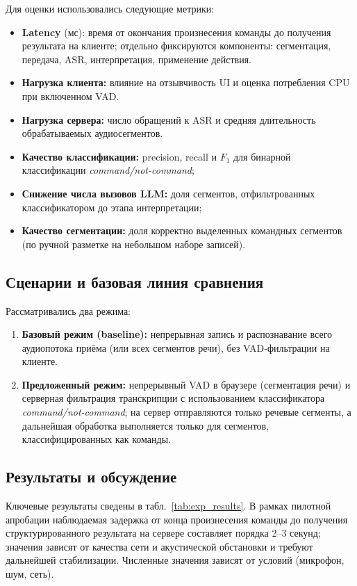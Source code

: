 Для оценки использовались следующие метрики:
\begin{itemize}
    \item \textbf{Latency} (мс): время от окончания произнесения команды до получения результата на клиенте; отдельно фиксируются компоненты: сегментация, передача, ASR, интерпретация, применение действия.
    \item \textbf{Нагрузка клиента:} влияние на отзывчивость UI и оценка потребления CPU при включенном VAD.
    \item \textbf{Нагрузка сервера:} число обращений к ASR и средняя длительность обрабатываемых аудиосегментов.
    \item \textbf{Качество классификации:} precision, recall и $F_1$ для бинарной классификации \textit{command/not-command};
    \item \textbf{Снижение числа вызовов LLM:} доля сегментов, отфильтрованных классификатором до этапа интерпретации;
    \item \textbf{Качество сегментации:} доля корректно выделенных командных сегментов (по ручной разметке на небольшом наборе записей).
\end{itemize}

\subsection{Сценарии и базовая линия сравнения}
\label{subsec:setup}

Рассматривались два режима:
\begin{enumerate}
    \item \textbf{Базовый режим (baseline):} непрерывная запись и распознавание всего аудиопотока приёма (или всех сегментов речи), без VAD‑фильтрации на клиенте.
    \item \textbf{Предложенный режим:} непрерывный VAD в браузере (сегментация речи) и серверная фильтрация транскрипции с использованием классификатора \textit{command/not-command}; на сервер отправляются только речевые сегменты, а дальнейшая обработка выполняется только для сегментов, классифицированных как команды.
\end{enumerate}

\subsection{Результаты и обсуждение}
\label{subsec:results}

Ключевые результаты сведены в табл.~\ref{tab:exp_results}. В рамках пилотной апробации наблюдаемая задержка от конца произнесения команды до получения структурированного результата на сервере составляет порядка 2--3 секунд; значения зависят от качества сети и акустической обстановки и требуют дальнейшей стабилизации.
Численные значения зависят от условий (микрофон, шум, сеть).

